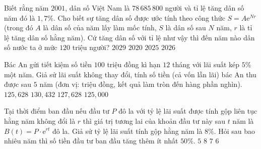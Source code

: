 \begin{ex}%
	Biết rằng năm $2001$, dân số Việt Nam là $78\,685\,800$ người và tỉ lệ tăng dân số năm đó là $1{,}7\%$. Cho biết sự  tăng dân số được ước tính theo công thức $S=A\mathrm{e}^{Nr}$ (trong đó $A$ là dân số của năm lấy làm mốc tính, $S$ là dân số sau $N$ năm, $r$ là tỉ lệ tăng dân số hằng năm). Cứ tăng dân số với tỉ lệ như vậy thì đến năm nào dân số nước ta ở mức $120$ triệu người?
	\choice 
		{$2029$} 
		 {$2020$}
		{$2025$} 
		 {\True $2026$}
\end{ex}

\begin{ex}%
	Bác An gửi tiết kiệm số tiền $100$ triệu đồng kì hạn $12$  tháng với lãi suất kép $5\%$ một năm. Giả sử lãi suất không thay đổi, tính số tiền (cả vốn lẫn lãi) bác An thu được sau $5$ năm (đơn vị: triệu đồng, kết quả làm tròn đến hàng phần nghìn).
	\choice 
		 {$125{,}628$}
		{$130{,}432$} 
		{\True  $127{,}628$}
		{$125{,}000$} 
\end{ex}

\begin{ex}%
	Tại thời điểm ban đầu nếu đầu tư $P$ đô la với tỷ lệ lãi suất được tính gộp liên tục hằng năm không  đổi là $r$ thì giá trị tương lai của khoản đầu tư này sau $t$ năm là $B(t)=P\cdot \mathrm{e}^{rt}$ đô la. Giả sử tỷ lệ lãi suất tính gộp hằng năm là $8\%$. Hỏi sau bao nhiêu năm thì số tiền đầu tư ban đầu tăng thêm ít nhất $50\%$.
	 \choice
		{$5$} 
		 {$8$}
		{$7$} 
		 {\True $6$}
\end{ex}

